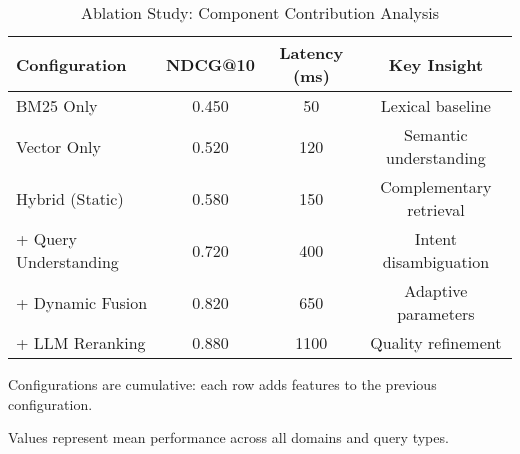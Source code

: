 \begin{table}[htbp]
\centering
\caption{Ablation Study: Component Contribution Analysis}
\label{tab:ablation-study}
\begin{tabular}{lccc}
\toprule
Configuration & NDCG@10 & Latency (ms) & Key Insight \\
\midrule
BM25 Only & 0.450 & 50 & Lexical baseline \\
Vector Only & 0.520 & 120 & Semantic understanding \\
Hybrid (Static) & 0.580 & 150 & Complementary retrieval \\
+ Query Understanding & 0.720 & 400 & Intent disambiguation \\
+ Dynamic Fusion & 0.820 & 650 & Adaptive parameters \\
+ LLM Reranking & 0.880 & 1100 & Quality refinement \\
\bottomrule
\end{tabular}
\begin{tablenotes}
\small
\item Configurations are cumulative: each row adds features to the previous configuration.
\item Values represent mean performance across all domains and query types.
\end{tablenotes}
\end{table}
